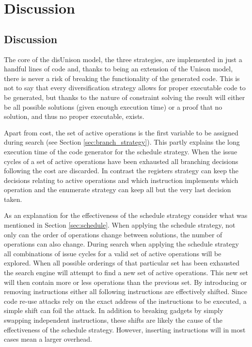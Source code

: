 \chapter{Discussion}
\label{chapter:discussion}

\section{Discussion}
\label{sec:discussion}

The core of the disUnison model, the three strategies, are implemented in just a handful
lines of code and, thanks to being an extension of the Unison model, there is never a risk
of breaking the functionality of the generated code. This is not to say that every
diversification strategy allows for proper executable code to be generated, but thanks to
the nature of constraint solving the result will either be all possible solutions
(given enough execution time) or a proof that no solution, and thus no proper executable,
exists.

Apart from cost, the set of active operations is the first variable to be assigned during
search (see Section \ref{sec:branch_strategy}). This partly explains the long execution
time of the code generator for the schedule strategy. When the issue cycles of a set of
active operations have been exhausted all branching decisions following the cost are
discarded. In contrast the registers strategy can keep the decisions relating to active
operations and which instruction implements which operation and the enumerate strategy can
keep all but the very last decision taken.

As an explanation for the effectiveness of the schedule strategy consider what was
mentioned in Section \ref{sec:schedule}. When applying the schedule strategy, not only can
the order of operations change between solutions, the number of operations can also change.
During search when applying the schedule strategy all combinations of issue cycles for a
valid set of active operations will be explored. When all possible orderings of that
particular set has been exhausted the search engine will attempt to find a new set of
active operations. This new set will then contain more or less operations than
the previous set. By introducing or removing instructions either all following instructions
are effectively shifted. Since code re-use attacks rely on the exact address of the
instructions to be executed, a simple shift can foil the attack. In addition to breaking
gadgets by simply swapping independent instructions, these shifts are likely the cause of
the effectiveness of the schedule strategy. However, inserting instructions will in most
cases mean a larger overhead.

